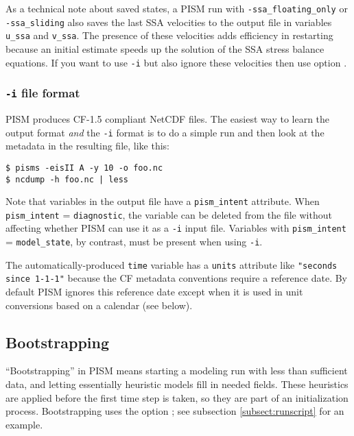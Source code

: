 As a technical note about saved states, a PISM run with \texttt{-ssa_floating_only} or \texttt{-ssa_sliding} also saves the last SSA velocities to the output file in variables \texttt{u_ssa} and \texttt{v_ssa}.  The presence of these velocities adds efficiency in restarting because an initial estimate speeds up the solution of the SSA stress balance equations.  If you want to use \texttt{-i} but also ignore these velocities then use option .

\subsubsection*{\texttt{-i} file format}
\label{sec:i-format}
PISM produces CF-1.5 compliant NetCDF files.  The easiest way to learn the output format \emph{and} the \texttt{-i} format is to do a simple run and then look at the metadata in the resulting file, like this:
\begin{verbatim}
$ pisms -eisII A -y 10 -o foo.nc
$ ncdump -h foo.nc | less
\end{verbatim}

Note that variables in the output file have a \texttt{pism_intent} attribute.  When \texttt{pism_intent} = \texttt{diagnostic}, the variable can be deleted from the file without affecting whether PISM can use it as a \texttt{-i} input file.  Variables with \texttt{pism_intent} = \texttt{model_state}, by contrast, must be present when using \texttt{-i}.

The automatically-produced \texttt{time} variable has a \texttt{units} attribute like \texttt{"seconds since 1-1-1"} because the CF metadata conventions require a reference date.  By default PISM ignores this reference date except when it is used in unit conversions based on a calendar (see below).


\subsection{Bootstrapping}
\label{sec:bootstrapping}

``Bootstrapping'' in PISM means starting a modeling run with less than sufficient data, and letting essentially heuristic models fill in needed fields.  These heuristics are applied before the first time step is taken, so they are part of an initialization process.  Bootstrapping uses the option ; see subsection \ref{subsect:runscript} for an example.

